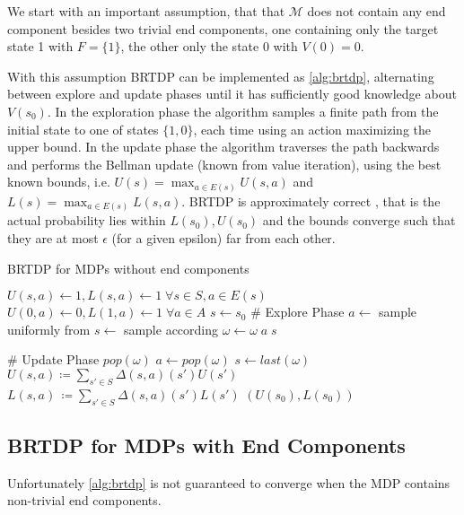 We start with an important assumption, that
that $\mathcal{M}$ does not contain any end component
besides two trivial end components, one containing only the target state
1 with $F = \{1\}$, the other only the state 0 with $V(0) = 0$.

With this assumption BRTDP can be implemented as \autoref{alg:brtdp},
alternating between explore and update phases until it has sufficiently
good knowledge about $V(s_0)$. In the exploration phase the algorithm
samples a finite path from the initial state to one of states
$\{1, 0\}$, each time using an action maximizing the upper bound.
In the update phase the algorithm traverses the path backwards and
performs the Bellman update (known from value iteration),
using the best known bounds, i.e.
$U(s) = \max_{a \in E(s)} U(s, a)$
and
$L(s) = \max_{a \in E(s)} L(s, a)$.
BRTDP is approximately correct \parencite{atva14}, that is the actual
probability lies within $L(s_0), U(s_0)$ and the bounds converge such
that they are at most $\epsilon$ (for a given epsilon) far from each other.


\begin{algorithm}
\caption{BRTDP for MDPs without end components}
\label{alg:brtdp}
\begin{algorithmic}
\State $U(s,a) \gets 1, L(s,a) \gets 1 \; \forall s \in S, a \in E(s)$
\State $U(0,a) \gets 0, L(1,a) \gets 1 \; \forall a \in A$
\State $s \gets s_0$
    \State \# Explore Phase
        \State $a \gets$ sample uniformly from
        \State $s \gets $ sample according
        \State $\omega \gets \omega \; a \; s$
    \EndWhile

    \State \# Update Phase
        \State $pop(\omega)$
        \State $a \gets pop(\omega)$
        \State $s \gets last(\omega)$
        \State $U(s,a) \coloneqq \sum_{s' \in S} \Delta(s,a)(s') U(s')$
        \State $L(s,a)\, \coloneqq \sum_{s' \in S} \Delta(s,a)(s') L(s')$
    \EndWhile
\EndWhile
\State \Return $(U(s_0), L(s_0))$
\end{algorithmic}
\end{algorithm}

\subsection*{BRTDP for MDPs with End Components}
Unfortunately \autoref{alg:brtdp} is not guaranteed to converge
when the MDP contains non-trivial end components.

